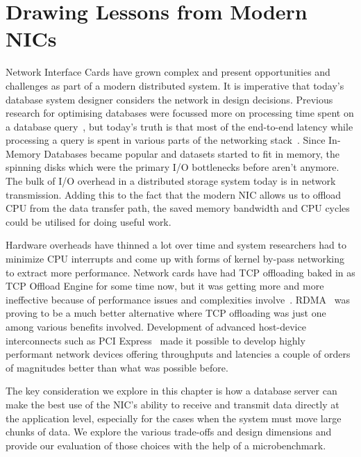 \chapter{Drawing Lessons from Modern NICs}
\label{chap:modernnics}
Network Interface Cards have grown complex and present opportunities and challenges as part of a modern distributed system.
 It is imperative that today’s database system designer considers the network in design decisions.
 Previous research for optimising databases were focussed more on processing time spent on a database query~\cite{dbmsproctime},
  but today’s truth is that most of the end-to-end latency while processing a query is spent in various parts of the networking stack~\cite{ramcloudosr}.
Since In-Memory Databases became popular and datasets started to fit in memory, the spinning disks 
which were the primary I/O bottlenecks before aren't anymore. The bulk of I/O overhead in a distributed storage system today is in network transmission.
Adding this to the fact that the modern NIC allows us to offload CPU from the data transfer path,
the saved memory bandwidth and CPU cycles could be utilised for doing useful work.

Hardware overheads have thinned a lot over time and system researchers had to minimize CPU interrupts and come up with forms of kernel by-pass networking to extract more performance.
 Network cards have had TCP offloading baked in as TCP Offload Engine for some time now, but it was getting more and more ineffective because of performance issues and complexities involve~\cite{tcpoffload}. 
 RDMA~\cite{rdmapatent,rdmacase,rdma} was proving to be a much better alternative where TCP offloading was just one among various benefits involved.
  Development of advanced host-device interconnects such as PCI Express~\cite{pcie}  made it possible to develop highly performant network devices offering throughputs and latencies a couple of orders of magnitudes better than what was possible before.

 The key consideration we explore in this chapter is how a database server can make the best use of the NIC’s ability to receive and transmit data directly at the application level, especially for the
cases when the system must move large chunks of data. We explore the various trade-offs and design dimensions and provide our evaluation of those choices with the help of a microbenchmark.

